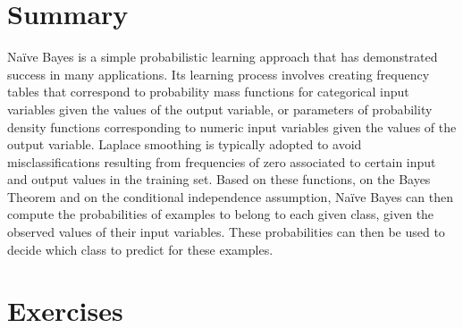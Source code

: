 \section{Summary}

Na\"ive Bayes is a simple probabilistic learning approach that has demonstrated success in many applications. Its learning process involves creating frequency tables that correspond to probability mass functions for categorical input variables given the values of the output variable, or parameters of probability density functions corresponding to numeric input variables given the values of the output variable. Laplace smoothing is typically adopted to avoid misclassifications resulting from frequencies of zero associated to certain input and output values in the training set. Based on these functions, on the Bayes Theorem and on the conditional independence assumption, Na\"ive Bayes can then compute the probabilities of examples to belong to each given class, given the observed values of their input variables. These probabilities can then be used to decide which class to predict for these examples.


\section{Exercises}


